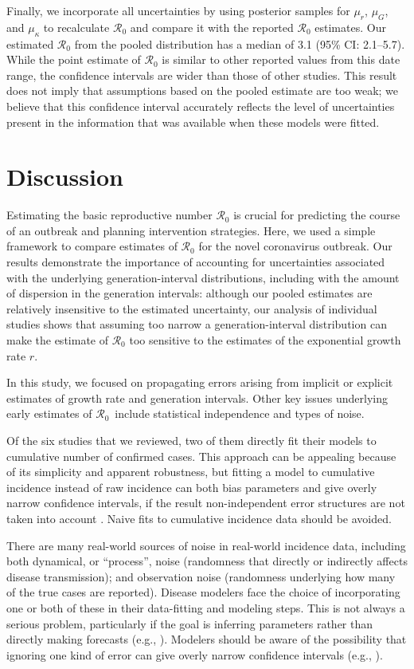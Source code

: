 \documentclass[12pt]{article}
\newcommand{\Rx}[1]{\ensuremath{{\mathcal R}_{#1}}}
\newcommand{\Ro}{\Rx{0}\xspace}
\begin{document}
Finally, we incorporate all uncertainties by using posterior samples for $\mu_r$, $\mu_G$, and $\mu_\kappa$ to recalculate \Ro and compare it with the reported \Ro estimates.
Our estimated \Ro from the pooled distribution has a median of 3.1 (95\% CI: 2.1--5.7).
While the point estimate of \Ro is similar to other reported values from this date range, the confidence intervals are wider than those of other studies.
This result does not imply that assumptions based on the pooled estimate are too weak;
we believe that this confidence interval accurately reflects the level of uncertainties present in the information that was available when these models were fitted.

\section{Discussion}

Estimating the basic reproductive number \Ro is crucial for predicting the course of an outbreak and planning intervention strategies.
Here, we used a simple framework \citep{park2019practical} to compare estimates of \Ro for the novel coronavirus outbreak.
Our results demonstrate the importance of accounting for uncertainties associated with the underlying generation-interval distributions, including with the amount of dispersion in the generation intervals:
although our pooled estimates are relatively insensitive to the estimated uncertainty, our analysis of individual studies shows that assuming too narrow a generation-interval distribution can make the estimate of \Ro too sensitive to the estimates of the exponential growth rate $r$.

In this study, we focused on propagating errors arising from implicit or explicit estimates of growth rate and generation intervals. Other key issues underlying early estimates of \Ro\ include statistical independence and types of noise. 

Of the six studies that we reviewed, two of them directly fit their models to cumulative number of confirmed cases.
This approach can be appealing because of its simplicity and apparent robustness, but fitting a model to cumulative incidence instead of raw incidence can both bias parameters and give overly narrow confidence intervals, if the result non-independent error structures are not taken into account \citep{ma2014estimating, king2015avoidable}.
Naive fits to cumulative incidence data should be avoided.

There are many real-world sources of noise in real-world incidence data, including both dynamical, or ``process'', noise (randomness that directly or indirectly affects disease transmission); and observation noise (randomness underlying how many of the true cases are reported).  
Disease modelers face the choice of incorporating one or both of these in their data-fitting and modeling steps. 
This is not always a serious problem, particularly if the goal is inferring parameters rather than directly making forecasts (e.g., \citep{ma2014estimating}).
Modelers should be aware of the possibility that ignoring one kind of error can give overly narrow confidence intervals (e.g., \citep{king2015avoidable}).
\end{document}
